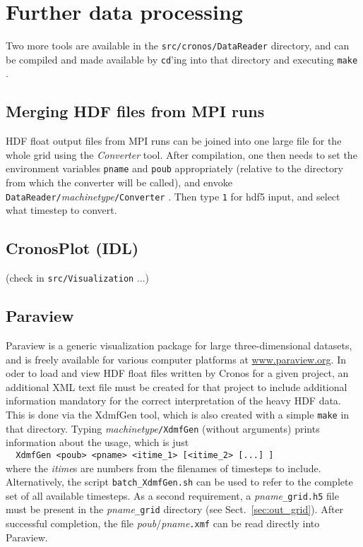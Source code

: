 \section{Further data processing}

Two more tools are available in the {\tt src/cronos/DataReader} directory, and
can be compiled and made available by {\tt cd}'ing into that directory and
executing {\tt make} .

\subsection{Merging HDF files from MPI runs}
\label{s:converter}

HDF float output files from MPI runs can be joined into one large file for the
whole grid using the {\em Converter} tool. After compilation, one then needs
to set the environment variables {\tt pname} and {\tt poub}
appropriately (relative to the directory from which the converter will be
called), and envoke {\tt DataReader/}{\em machinetype}{\tt /Converter} .
Then type {\tt 1} for hdf5 input, and select what timestep to convert.

\subsection{CronosPlot (IDL)}

(check in {\tt src/Visualization} ...)

\subsection{Paraview}
\label{s:paraview}

Paraview is a generic visualization package for large
three-dimensional datasets, and is freely available for various computer
platforms at \url{www.paraview.org}. In oder to load and view HDF float files
written
by {\sc Cronos} for a given project, an additional XML text file must be
created for that project to include additional information mandatory for the
correct interpretation of the heavy HDF data. This is done via the
{\sc XdmfGen} tool, which is also created with a simple {\tt make} in that
directory. Typing {\em machinetype}{\tt /XdmfGen} (without arguments) prints
information about the usage, which is just \\
\verb+  XdmfGen <poub> <pname> <itime_1> [<itime_2> [...] ]+ \\
where the {\em itime}s are numbers from the filenames of timesteps to include.
Alternatively, the script {\tt batch\_XdmfGen.sh} can be used to refer to the
complete set of all available timesteps.
As a second requirement, a \textit{pname}\verb+_grid.h5+ file must be present in the \textit{pname}\verb+_grid+ directory (see Sect.~\ref{sec:out_grid}).
After successful completion, the file {\em poub}/{\em pname}{\tt.xmf} can be
read directly into Paraview.

